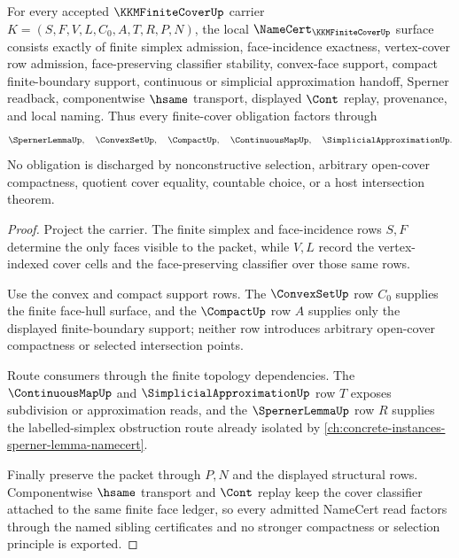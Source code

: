 \begin{theorem}
\label{thm:kkm-finite-cover-namecert-obligations}
For every accepted $\KKMFiniteCoverUp$ carrier $K=(S,F,V,L,C_0,A,T,R,P,N)$, the local $\NameCert_{\KKMFiniteCoverUp}$ surface consists exactly of finite simplex admission, face-incidence exactness, vertex-cover row admission, face-preserving classifier stability, convex-face support, compact finite-boundary support, continuous or simplicial approximation handoff, Sperner readback, componentwise $\hsame$ transport, displayed $\Cont$ replay, provenance, and local naming. Thus every finite-cover obligation factors through
$$
\SpernerLemmaUp,\quad \ConvexSetUp,\quad \CompactUp,\quad \ContinuousMapUp,\quad \SimplicialApproximationUp .
$$
No obligation is discharged by nonconstructive selection, arbitrary open-cover compactness, quotient cover equality, countable choice, or a host intersection theorem.
\end{theorem}
\begin{proof}
Project the carrier. The finite simplex and face-incidence rows $S,F$ determine the only faces visible to the packet, while $V,L$ record the vertex-indexed cover cells and the face-preserving classifier over those same rows.

Use the convex and compact support rows. The $\ConvexSetUp$ row $C_0$ supplies the finite face-hull surface, and the $\CompactUp$ row $A$ supplies only the displayed finite-boundary support; neither row introduces arbitrary open-cover compactness or selected intersection points.

Route consumers through the finite topology dependencies. The $\ContinuousMapUp$ and $\SimplicialApproximationUp$ row $T$ exposes subdivision or approximation reads, and the $\SpernerLemmaUp$ row $R$ supplies the labelled-simplex obstruction route already isolated by \autoref{ch:concrete-instances-sperner-lemma-namecert}.

Finally preserve the packet through $P,N$ and the displayed structural rows. Componentwise $\hsame$ transport and $\Cont$ replay keep the cover classifier attached to the same finite face ledger, so every admitted NameCert read factors through the named sibling certificates and no stronger compactness or selection principle is exported.
\end{proof}


